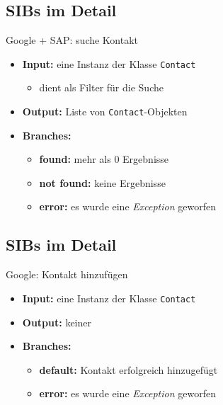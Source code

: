 \subsection*{SIBs im Detail}
\begin{frame}{Google + SAP: suche Kontakt}
\begin{itemize}[<+->]
	\item \textbf{Input:} eine Instanz der Klasse \texttt{Contact}
		\begin{itemize}[<+->]
			\item dient als Filter für die Suche
		\end{itemize}
	\item \textbf{Output:} Liste von \texttt{Contact}-Objekten

	\item \textbf{Branches:}
		\begin{itemize}[<+->]
			\item \textbf{found:} mehr als 0 Ergebnisse
			\item \textbf{not found:} keine Ergebnisse
			\item \textbf{error:} es wurde eine \textit{Exception} geworfen
		\end{itemize}

\end{itemize}
\end{frame}


\subsection*{SIBs im Detail}
\begin{frame}{Google: Kontakt hinzufügen}
\begin{itemize}[<+->]
	\item \textbf{Input:} eine Instanz der Klasse \texttt{Contact}

	\item \textbf{Output:} keiner

	\item \textbf{Branches:}
		\begin{itemize}[<+->]
			\item \textbf{default:} Kontakt erfolgreich hinzugefügt
			\item \textbf{error:} es wurde eine \textit{Exception} geworfen
		\end{itemize}

\end{itemize}
\end{frame}


